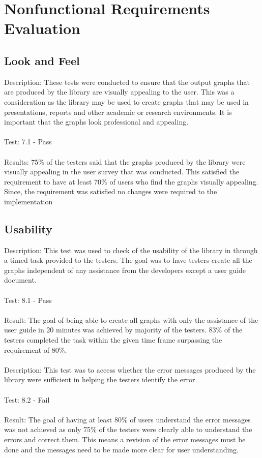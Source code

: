 \documentclass[12pt, titlepage]{article}
\begin{document}
\section{Nonfunctional Requirements Evaluation}
\subsection{Look and Feel}

Description: These tests were conducted to ensure that the output graphs that are produced by the library are visually appealing to the user. This was a consideration as the library may be used to create graphs that may be used in presentations, reports and other academic or research environments. It is important that the graphs look professional and appealing.\\\\
Test: 7.1 - Pass\\\\
Results: 75\% of the testers said that the graphs produced by the library were visually appealing in the user survey that was conducted. This satisfied the requirement to have at least 70\% of users who find the graphs visually appealing. Since, the requirement was satisfied no changes were required to the implementation


\subsection{Usability}

Description:  This test was used to check of the usability of the library in through a timed task provided to the testers. The goal was to have testers create all the graphs independent of any assistance from the developers except a user guide document. \\\\
Test: 8.1 - Pass\\\\
Result: The goal of being able to create all graphs with only the assistance of the user guide in 20 minutes was achieved by majority of the testers. 83\% of the testers completed the task within the given time frame surpassing the requirement of 80\%.\\\\
Description: This test was to access whether the error messages produced by the library were sufficient in helping the testers identify the error. \\\\
Test: 8.2 - Fail\\\\ 	\label{sec:8.2}
Result: The goal of having at least 80\% of users understand the error messages was not achieved as only 75\% of the testers were clearly able to understand the errors and correct them. This means a revision of the error messages must be done and the messages need to be made more clear for user understanding.
\end{document}
